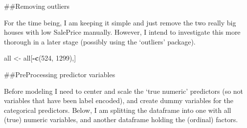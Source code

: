 \documentclass[]{article}
\newenvironment{Shaded}{\begin{snugshade}}{\end{snugshade}}
\newcommand{\DecValTok}[1]{\textcolor[rgb]{0.00,0.00,0.81}{#1}}
\newcommand{\KeywordTok}[1]{\textcolor[rgb]{0.13,0.29,0.53}{\textbf{#1}}}
\newcommand{\NormalTok}[1]{#1}
\newcommand{\OperatorTok}[1]{\textcolor[rgb]{0.81,0.36,0.00}{\textbf{#1}}}
\newcommand{\StringTok}[1]{\textcolor[rgb]{0.31,0.60,0.02}{#1}}
\begin{document}
\begin{Shaded}
\end{Shaded}

\#\#Removing outliers

For the time being, I am keeping it simple and just remove the two
really big houses with low SalePrice manually. However, I intend to
investigate this more thorough in a later stage (possibly using the
`outliers' package).

\begin{Shaded}
\begin{Highlighting}[]
\NormalTok{all <-}\StringTok{ }\NormalTok{all[}\OperatorTok{-}\KeywordTok{c}\NormalTok{(}\DecValTok{524}\NormalTok{, }\DecValTok{1299}\NormalTok{),]}
\end{Highlighting}
\end{Shaded}

\#\#PreProcessing predictor variables

Before modeling I need to center and scale the `true numeric' predictors
(so not variables that have been label encoded), and create dummy
variables for the categorical predictors. Below, I am splitting the
dataframe into one with all (true) numeric variables, and another
dataframe holding the (ordinal) factors.
\end{document}
